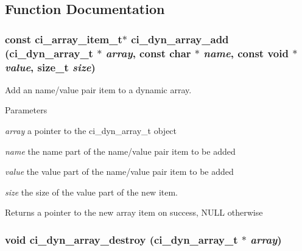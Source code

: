 \subsection{Function Documentation}
\hypertarget{group__DYNAMIC__ARRAYS_gacda11afc2e4648980feb3b807d62bde3}{
\subsubsection[{ci\_\-dyn\_\-array\_\-add}]{\setlength{\rightskip}{0pt plus 5cm}const ci\_\-array\_\-item\_\-t$\ast$ ci\_\-dyn\_\-array\_\-add ({\bf ci\_\-dyn\_\-array\_\-t} $\ast$ {\em array}, \/  const char $\ast$ {\em name}, \/  const void $\ast$ {\em value}, \/  size\_\-t {\em size})}}
\label{group__DYNAMIC__ARRAYS_gacda11afc2e4648980feb3b807d62bde3}


Add an name/value pair item to a dynamic array. 
\begin{DoxyParams}{Parameters}
\item[{\em array}]a pointer to the ci\_\-dyn\_\-array\_\-t object \item[{\em name}]the name part of the name/value pair item to be added \item[{\em value}]the value part of the name/value pair item to be added \item[{\em size}]the size of the value part of the new item. \end{DoxyParams}
\begin{DoxyReturn}{Returns}
a pointer to the new array item on success, NULL otherwise 
\end{DoxyReturn}
\hypertarget{group__DYNAMIC__ARRAYS_gab25a8dc94700a06da76b8fa7d0f0c89f}{
\subsubsection[{ci\_\-dyn\_\-array\_\-destroy}]{\setlength{\rightskip}{0pt plus 5cm}void ci\_\-dyn\_\-array\_\-destroy ({\bf ci\_\-dyn\_\-array\_\-t} $\ast$ {\em array})}}
\label{group__DYNAMIC__ARRAYS_gab25a8dc94700a06da76b8fa7d0f0c89f}


